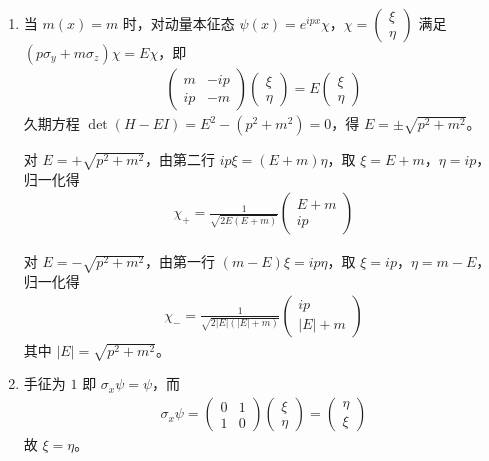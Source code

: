 \begin{enumerate}
{\begin{enumerate}
		\item 当 $m(x)=m$ 时，对动量本征态 $\psi(x)=e^{ipx}\chi$，$\chi=\begin{pmatrix}\xi\\\eta\end{pmatrix}$ 满足 $(p\sigma_y+m\sigma_z)\chi=E\chi$，即
		\begin{align*}
			\begin{pmatrix} m & -ip \\ ip & -m \end{pmatrix}\begin{pmatrix}\xi\\\eta\end{pmatrix}=E\begin{pmatrix}\xi\\\eta\end{pmatrix}
		\end{align*}
		久期方程 $\det(H-EI)=E^2-(p^2+m^2)=0$，得 $E=\pm\sqrt{p^2+m^2}$。
		
		对 $E=+\sqrt{p^2+m^2}$，由第二行 $ip\xi=(E+m)\eta$，取 $\xi=E+m$，$\eta=ip$，归一化得
		\begin{align*}
			\chi_+=\frac{1}{\sqrt{2E(E+m)}}\begin{pmatrix}E+m\\ip\end{pmatrix}
		\end{align*}
		
		对 $E=-\sqrt{p^2+m^2}$，由第一行 $(m-E)\xi=ip\eta$，取 $\xi=ip$，$\eta=m-E$，归一化得
		\begin{align*}
			\chi_-=\frac{1}{\sqrt{2|E|(|E|+m)}}\begin{pmatrix}ip\\|E|+m\end{pmatrix}
		\end{align*}
		其中 $|E|=\sqrt{p^2+m^2}$。
		
		\item 手征为 $1$ 即 $\sigma_x\psi=\psi$，而
		\begin{align*}
			\sigma_x\psi=\begin{pmatrix}0&1\\1&0\end{pmatrix}\begin{pmatrix}\xi\\\eta\end{pmatrix}=\begin{pmatrix}\eta\\\xi\end{pmatrix}
		\end{align*}
		故 $\xi=\eta$。
		

\end{enumerate}}
\end{enumerate}
